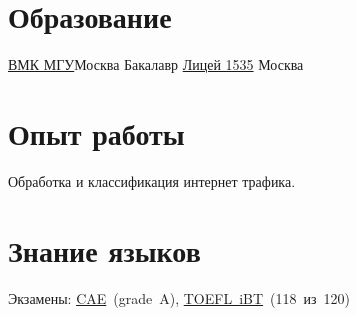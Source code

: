 \documentclass[11pt,a4paper,roman]{moderncv}
\begin{document}
\makecvtitle

\section{Образование}
        {\href{http://cs.msu.ru/}{ВМК МГУ}}{Москва}
        {Бакалавр}
        {}
        {\href{http://liceum1535.ru/}{Лицей 1535}}
        {Москва}
        {}{}

\section{Опыт работы}
        {}{Обработка и классификация интернет трафика.}

\section{Знание языков}
  {Экзамены:
    \href{https://ru.wikipedia.org/wiki/Certificate_in_Advanced_English}{CAE}~(grade~A),
    \href{https://ru.wikipedia.org/wiki/TOEFL}{TOEFL~iBT}~(118~из~120)
  }
\end{document}
